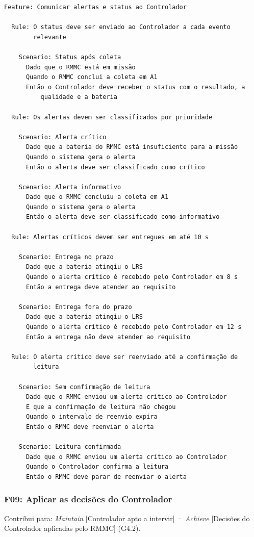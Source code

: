 \documentclass[a4paper, 12pt]{article}
\begin{document}
{\small
\begin{verbatim}
Feature: Comunicar alertas e status ao Controlador

  Rule: O status deve ser enviado ao Controlador a cada evento
        relevante

    Scenario: Status após coleta
      Dado que o RMMC está em missão
      Quando o RMMC conclui a coleta em A1
      Então o Controlador deve receber o status com o resultado, a
          qualidade e a bateria

  Rule: Os alertas devem ser classificados por prioridade

    Scenario: Alerta crítico
      Dado que a bateria do RMMC está insuficiente para a missão
      Quando o sistema gera o alerta
      Então o alerta deve ser classificado como crítico

    Scenario: Alerta informativo
      Dado que o RMMC concluiu a coleta em A1
      Quando o sistema gera o alerta
      Então o alerta deve ser classificado como informativo

  Rule: Alertas críticos devem ser entregues em até 10 s

    Scenario: Entrega no prazo
      Dado que a bateria atingiu o LRS
      Quando o alerta crítico é recebido pelo Controlador em 8 s
      Então a entrega deve atender ao requisito

    Scenario: Entrega fora do prazo
      Dado que a bateria atingiu o LRS
      Quando o alerta crítico é recebido pelo Controlador em 12 s
      Então a entrega não deve atender ao requisito

  Rule: O alerta crítico deve ser reenviado até a confirmação de
        leitura

    Scenario: Sem confirmação de leitura
      Dado que o RMMC enviou um alerta crítico ao Controlador
      E que a confirmação de leitura não chegou
      Quando o intervalo de reenvio expira
      Então o RMMC deve reenviar o alerta

    Scenario: Leitura confirmada
      Dado que o RMMC enviou um alerta crítico ao Controlador
      Quando o Controlador confirma a leitura
      Então o RMMC deve parar de reenviar o alerta
\end{verbatim}
}

\Needspace{8cm}
\subsubsection{F09: Aplicar as decisões do Controlador}

Contribui para: \textit{Maintain} [Controlador apto a intervir] · \textit{Achieve} [Decisões do Controlador aplicadas pelo RMMC] (G4.2).
\end{document}
